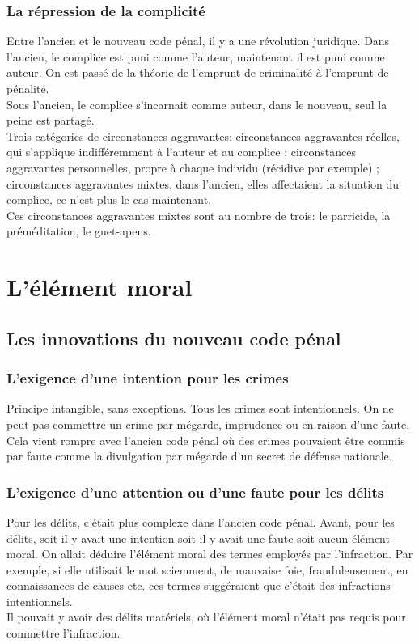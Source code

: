 \documentclass[10pt, a4paper, openany]{book}
\begin{document}
\subsection{La répression de la complicité}

Entre l'ancien et le nouveau code pénal, il y a une révolution juridique. Dans l'ancien, le complice est puni comme l'auteur, maintenant il est puni comme auteur. On est passé de la théorie de l'emprunt de criminalité à l'emprunt de pénalité. \\
Sous l'ancien, le complice s'incarnait comme auteur, dans le nouveau, seul la peine est partagé. \\
Trois catégories de circonstances aggravantes: circonstances aggravantes réelles, qui s'applique indifféremment à l'auteur et au complice ; circonstances aggravantes personnelles, propre à chaque individu (récidive par exemple) ; circonstances aggravantes mixtes, dans l'ancien, elles affectaient la situation du complice, ce n'est plus le cas maintenant. \\
Ces circonstances aggravantes mixtes sont au nombre de trois: le parricide, la préméditation, le guet-apens. 

\chapter{L'élément moral}

\section{Les innovations du nouveau code pénal}

\subsection{L'exigence d'une intention pour les crimes}

Principe intangible, sans exceptions. Tous les crimes sont intentionnels. On ne peut pas commettre un crime par mégarde, imprudence ou en raison d'une faute. Cela vient rompre avec l'ancien code pénal où des crimes pouvaient être commis par faute comme la divulgation par mégarde d'un secret de défense nationale. 

\subsection{L'exigence d'une attention ou d'une faute pour les délits}

Pour les délits, c'était plus complexe dans l'ancien code pénal. Avant, pour les délits, soit il y avait une intention soit il y avait une faute soit aucun élément moral. On allait déduire l'élément moral des termes employés par l'infraction. Par exemple, si elle utilisait le mot sciemment, de mauvaise foie, frauduleusement, en connaissances de causes etc. ces termes suggéraient que c'était des infractions intentionnels. \\
Il pouvait y avoir des délits matériels, où l'élément moral n'était pas requis pour commettre l'infraction. 
\end{document}
